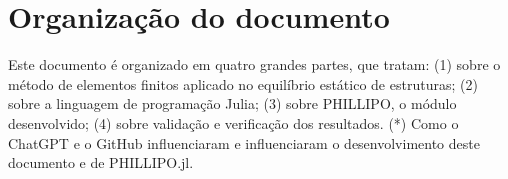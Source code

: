 \section{Organização do documento}

Este documento é organizado em quatro grandes partes, que tratam: (1) sobre o método de elementos finitos aplicado no equilíbrio estático de estruturas; (2) sobre a linguagem de programação Julia; (3) sobre PHILLIPO, o módulo desenvolvido; (4) sobre validação e verificação dos resultados. (*) Como o ChatGPT e o GitHub influenciaram e influenciaram o desenvolvimento deste documento e de PHILLIPO.jl.

